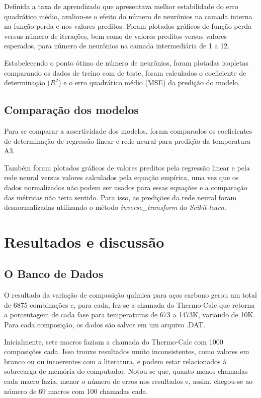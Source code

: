 \documentclass[brazil,tf,epusp]{usp}  %
\begin{document}
Definida a taxa de aprendizado que apresentava melhor estabilidade do erro quadrático médio, avaliou-se o efeito do número de neurônios na camada interna na função perda e nos valores preditos. Foram plotados gráficos de função perda versus número de iterações, bem como de valores preditos versus valores esperados, para número de neurônios na camada intermediária de 1 a 12.

Estabelecendo o ponto ótimo de número de neurônios, foram plotadas isopletas comparando os dados de treino com de teste, foram calculados o coeficiente de determinação ($R^{2}$) e o erro quadrático médio (MSE) da predição do modelo.

\section{Comparação dos modelos}

Para se comparar a assertividade dos modelos, foram comparados os coeficientes de determinação de regressão linear e rede neural para predição da temperatura A3.

Também foram plotados gráficos de valores preditos pela regressão linear e pela rede neural versus valores calculados pela equação empírica, uma vez que os dados normalizados não podem ser usados para essas equações e a comparação das métricas não teria sentido. Para isso, as predições da rede neural foram desnormalizadas utilizando o método \textit{inverse\_transform} do \textit{Scikit-learn}.


\chapter{Resultados e discussão}

\section{O Banco de Dados}

O resultado da variação de composição química para aços carbono gerou um total de 6875 combinações e, para cada, fez-se a chamada do Thermo-Calc\textregistered{} que retorna a porcentagem de cada fase para temperaturas de 673 a 1473K, variando de 10K. Para cada composição, os dados são salvos em um arquivo .DAT.

Inicialmente, sete macros faziam a chamada do Thermo-Calc\textregistered{} com 1000 composições cada. Isso trouxe resultados muito inconsistentes, como valores em branco ou ou incoerentes com a literatura, e podem estar relacionados à sobrecarga de memória do computador. Notou-se que, quanto menos chamadas cada macro fazia, menor o número de erros nos resultados e, assim, chegou-se ao número de 69 macros com 100 chamadas cada.
\end{document}
